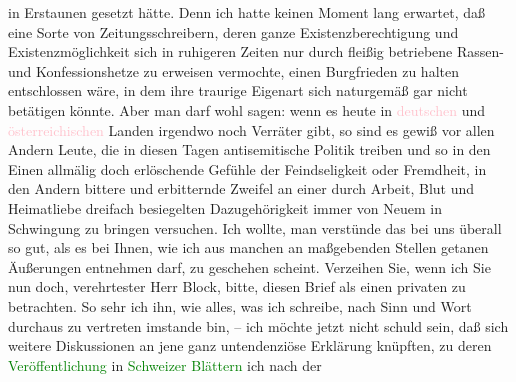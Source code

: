 {{{                        in Erstaunen gesetzt hätte. Denn ich hatte keinen Moment lang erwartet, daß
                        eine Sorte von Zeitungsschreibern, deren ganze Existenzberechtigung und
                        Existenzmöglichkeit sich in ruhigeren Zeiten nur durch fleißig betriebene
                        Rassen- und Konfessionshetze zu erweisen vermochte, einen Burgfrieden zu
                        halten entschlossen wäre, in dem ihre traurige Eigenart sich naturgemäß gar
                        nicht betätigen könnte. Aber man darf wohl sagen: wenn es heute in \textcolor{pink}{deutschen} und \textcolor{pink}{österreichischen} Landen irgendwo noch Verräter gibt, so sind es
                        gewiß vor allen Andern Leute, die in diesen Tagen antisemitische Politik
                        treiben und so in den Einen allmälig doch erlöschende Gefühle der
                        Feindseligkeit oder Fremdheit, in den Andern bittere und erbitternde Zweifel
                        an einer durch Arbeit, Blut und Heimatliebe dreifach besiegelten
                        Dazugehörigkeit immer von Neuem in Schwingung zu bringen versuchen. Ich
                        wollte, man verstünde das bei uns überall so gut, als es bei Ihnen, wie ich
                        aus manchen an maßgebenden Stellen getanen Äußerungen entnehmen darf, zu
                        geschehen scheint. Verzeihen Sie, wenn ich Sie nun doch, verehrtester Herr
                        Block, bitte, diesen Brief als einen privaten zu betrachten. So sehr ich
                        ihn, wie alles, was ich schreibe, nach Sinn und Wort durchaus zu vertreten
                        imstande bin, – ich möchte jetzt nicht schuld sein, daß sich weitere
                        Diskussionen an jene ganz untendenziöse Erklärung knüpften, zu deren \textcolor{green}{Veröffentlichung} in \textcolor{green}{Schweizer Blättern} ich nach der
}}}
